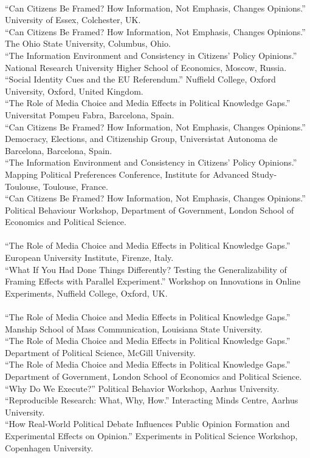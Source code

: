 \documentclass[12pt]{article}
\newcommand{\topic}[1]{\pagebreak[3]\indent {\color{lg}{\footnotesize #1 }}\\}
\newcommand{\entry}[1]{\indent {\color{lg}\guillemotright}\hspace{2pt}#1\vspace{.25em}\\}
\begin{document}
	\topic{Invited Presentations (2016)}
	\entry{``Can Citizens Be Framed? How Information, Not Emphasis, Changes Opinions.'' University of Essex, Colchester, UK.}
	\entry{``Can Citizens Be Framed? How Information, Not Emphasis, Changes Opinions.'' The Ohio State University, Columbus, Ohio.}
	\entry{``The Information Environment and Consistency in Citizens' Policy Opinions.'' National Research University Higher School of Economics, Moscow, Russia.}
	\entry{``Social Identity Cues and the EU Referendum.'' Nuffield College, Oxford University, Oxford, United Kingdom.}
	\entry{``The Role of Media Choice and Media Effects in Political Knowledge Gaps.'' Universitat Pompeu Fabra, Barcelona, Spain.}
	\entry{``Can Citizens Be Framed? How Information, Not Emphasis, Changes Opinions.'' Democracy, Elections, and Citizenship Group, Universistat Autonoma de Barcelona, Barcelona, Spain.}
	\entry{``The Information Environment and Consistency in Citizens' Policy Opinions.'' Mapping Political Preferences Conference, Institute for Advanced Study-Toulouse, Toulouse, France.}
	\entry{``Can Citizens Be Framed? How Information, Not Emphasis, Changes Opinions.'' Political Behaviour Workshop, Department of Government, London School of Economics and Political Science.}

	\topic{Invited Presentations (2015)}
	\entry{``The Role of Media Choice and Media Effects in Political Knowledge Gaps.'' European University Institute, Firenze, Italy.}
	\entry{``What If You Had Done Things Differently? Testing the Generalizability of Framing Effects with Parallel Experiment.'' Workshop on Innovations in Online Experiments, Nuffield College, Oxford, UK.}
	
	\topic{Invited Presentations (2014)}
	\entry{``The Role of Media Choice and Media Effects in Political Knowledge Gaps.'' Manship School of Mass Communication, Louisiana State University.}
	\entry{``The Role of Media Choice and Media Effects in Political Knowledge Gaps.'' Department of Political Science, McGill University.}
	\entry{``The Role of Media Choice and Media Effects in Political Knowledge Gaps.'' Department of Government, London School of Economics and Political Science.}
	\entry{``Why Do We Execute?'' Political Behavior Workshop, Aarhus University.}
	\entry{``Reproducible Research: What, Why, How.'' Interacting Minds Centre, Aarhus University.}
	\entry{``How Real-World Political Debate Influences Public Opinion Formation and Experimental Effects on Opinion.'' Experiments in Political Science Workshop, Copenhagen University.}
\end{document}
